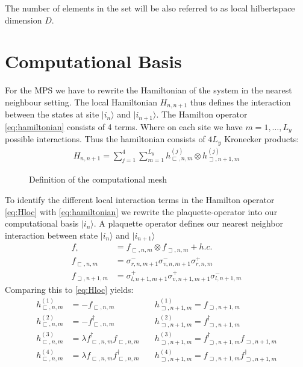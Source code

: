 \documentclass[12pt, a4paper, twoside, titlepage]{article}
\begin{document}
The number of elements in the set will be also referred to as local hilbertspace dimension $D$.

\newpage
\section{Computational Basis}
For the MPS we have to rewrite the Hamiltonian of the system in the nearest neighbour setting.
The local Hamiltonian $H_{n,n+1}$ thus defines the interaction between the states at site
$|i_n\rangle$ and $|i_{n+1}\rangle$.
The Hamilton operator \eqref{eq:hamiltonian} consists of 4 terms.
Where on each site we have $m=1,\dots,L_y$ possible interactions.
Thus the hamiltonian consists of $4L_y$ Kronecker products:
\begin{align}
H_{n,n+1}= \sum_{j=1}^4\sum_{m=1}^{L_y}h^{(j)}_{\sqsubset,n,m} \otimes h^{(j)}_{\sqsupset,n+1,m}\label{eq:Hloc}
\end{align}

\begin{figure}[hp!]
  \centering
  
  \caption{Definition of the computational mesh}
  \label{fig:locbasis}
\end{figure}

To identify the different local interaction terms in the Hamilton operator  \eqref{eq:Hloc} with \eqref{eq:hamiltonian} we rewrite the
plaquette-operator into our computational basis $|i_n\rangle$. A plaquette operator defines our nearest neighbor interaction between state
$|i_n\rangle$ and $|i_{n+1}\rangle$
\begin{align}
f_\square &= f_{\sqsubset,n,m}\otimes f_{\sqsupset,n,m} + h.c.\\
f_{\sqsubset,n,m} &= \sigma^-_{r,n,m+1}\sigma^-_{v,n,m+1}\sigma^+_{r,n,m}\\
f_{\sqsupset,n+1,m} &= \sigma^+_{l,n+1,m+1}\sigma^+_{v,n+1,m+1}\sigma^-_{l,n+1,m}
\end{align}
Comparing this to \eqref{eq:Hloc} yields:
\begin{align}
h^{(1)}_{\sqsubset,n,m} &=- f_{\sqsubset,n,m}\quad
&h^{(1)}_{\sqsupset,n+1,m} = f_{\sqsupset,n+1,m}\\
h^{(2)}_{\sqsubset,n,m} &=- f^\dagger_{\sqsubset,n,m}
\quad
&h^{(2)}_{\sqsupset,n+1,m} = f^\dagger_{\sqsupset,n+1,m}\\
h^{(3)}_{\sqsubset,n,m} &=\lambda f^\dagger_{\sqsubset,n,m}f_{\sqsubset,n,m}
\quad
&h^{(3)}_{\sqsupset,n+1,m} = f^\dagger_{\sqsupset,n+1,m}f_{\sqsupset,n+1,m}\\
h^{(4)}_{\sqsubset,n,m} &=
\lambda f_{\sqsubset,n,m}f^\dagger_{\sqsubset,n,m}
\quad
&h^{(4)}_{\sqsupset,n+1,m} =
f_{\sqsupset,n+1,m}f^\dagger_{\sqsupset,n+1,m}\\
\end{align}
\end{document}
